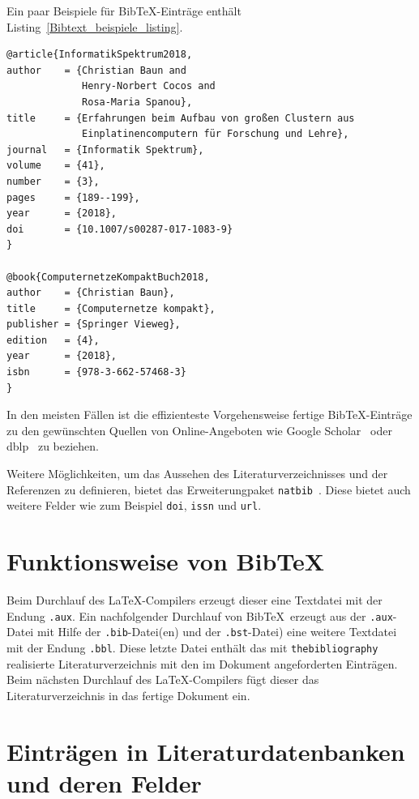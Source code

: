 \documentclass[a4paper,10pt,twoside]{scrbook}
\begin{document}
Ein paar Beispiele für Bib\TeX-Einträge enthält Listing~\ref{Bibtext_beispiele_listing}.


\begin{lstlisting}[caption={Einige Beispeile für Bib\TeX-Einträge},label=Bibtext_beispiele_listing, style=customlatex]
@article{InformatikSpektrum2018,
author    = {Christian Baun and
             Henry-Norbert Cocos and
             Rosa-Maria Spanou},
title     = {Erfahrungen beim Aufbau von großen Clustern aus
             Einplatinencomputern für Forschung und Lehre},
journal   = {Informatik Spektrum},
volume    = {41},
number    = {3},
pages     = {189--199},
year      = {2018},
doi       = {10.1007/s00287-017-1083-9}
}

@book{ComputernetzeKompaktBuch2018,
author    = {Christian Baun},
title     = {Computernetze kompakt},
publisher = {Springer Vieweg},
edition   = {4},
year      = {2018},
isbn      = {978-3-662-57468-3}
}
\end{lstlisting}


In den meisten Fällen ist die effizienteste Vorgehensweise fertige Bib\TeX-Einträge zu den gewünschten Quellen von Online-Angeboten wie Google Scholar~\cite{GoogleScholarWebseite} oder dblp~\cite{DBLPWebseite} zu beziehen.

Weitere Möglichkeiten, um das Aussehen des Literaturverzeichnisses und der Referenzen zu definieren, bietet das Erweiterungpaket \verb|natbib|~\cite{natbibDoku}. Diese bietet auch weitere Felder wie zum Beispiel \texttt{doi}, \texttt{issn} und \texttt{url}.


\section{Funktionsweise von Bib\TeX}
\label{Abschnitt_Funktionsweise_Bibtex}

Beim Durchlauf des \LaTeX-Compilers erzeugt dieser eine Textdatei mit der Endung \verb|.aux|. Ein nachfolgender Durchlauf von Bib\TeX\ erzeugt aus der \verb|.aux|-Datei mit Hilfe der \verb|.bib|-Datei(en) und der \verb|.bst|-Datei) eine weitere Textdatei mit der Endung \verb|.bbl|. Diese letzte Datei enthält das mit \verb|thebibliography| realisierte Literaturverzeichnis mit den im Dokument angeforderten Einträgen. Beim nächsten Durchlauf des \LaTeX-Compilers fügt dieser das Literaturverzeichnis in das fertige Dokument ein.




\section{Einträgen in Literaturdatenbanken und deren Felder}
\label{Abschnitt_Eintraege_Bibtex_Felder}
\end{document}
